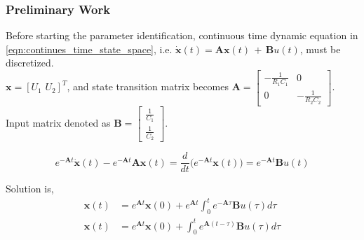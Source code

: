 \documentclass{beamer}
\begin{document}
\begin{frame}
	
	\frametitle{Preliminary Work}
	
	Before starting the parameter identification, continuous time dynamic equation  in \ref{eqn:continues_time_state_space}, i.e. $\dot{\bm{x}}(t) = \bm{A}\bm{x}(t)\,+\,\bm{B}u(t)$, must be discretized. \\
	
	$\bm{x} = [U_{1}\,\,U_{2}]^{T}$, and state transition matrix becomes $\bm{A} = \begin{bmatrix} -\frac{1}{R_{1}C_{1}} & 0 \\ 0 & -\frac{1}{R_{2}C_{2}} \end{bmatrix}$. Input matrix denoted as $\bm{B} = \begin{bmatrix} \frac{1}{C_{1}} \\ \frac{1}{C_{2}} \end{bmatrix}$.
	
	\begin{equation}
		\label{eqn:Solution_of_state_space equation_1}
		e^{-\bm{A}t}\dot{\bm{x}}(t) - e^{-\bm{A}t}\bm{A}\bm{x}(t) = \frac{d}{dt}\bigg(e^{-\bm{A}t}\bm{x}(t)\bigg)  = e^{-\bm{A}t}\bm{B}u(t)
	\end{equation}
	
	Solution is,
	\begin{subequations} 
		\label{eqn:Solution_of_state_space equation_3}
		\begin{align} 
			\bm{x}(t) &= e^{\bm{A}t}\bm{x}(0)  + e^{\bm{A}t}\int_{0}^{t} e^{-\bm{A}\tau}\bm{B}u(\tau)d\tau\\
			\bm{x}(t) &= e^{\bm{A}t}\bm{x}(0)  + \int_{0}^{t} e^{\bm{A}(t-\tau)}\bm{B}u(\tau)d\tau
		\end{align} 
	\end{subequations}
	
\end{frame}
\end{document}
